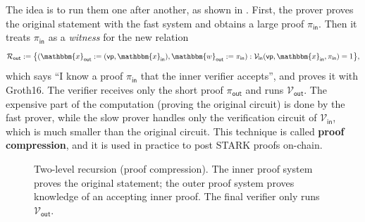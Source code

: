 \documentclass[../../book.tex]{subfiles}
\begin{document}
The idea is to run them one after another, as shown in .
First, the prover proves the original statement with the fast system and obtains a large proof $\pi_{\mathsf{in}}$.
Then it treats $\pi_{\mathsf{in}}$ as a \emph{witness} for the new relation
\begin{equation*}
    \mathcal{R}_{\mathsf{out}} := \big\{ (\mathbbm{x}_{\mathsf{out}} := (\mathsf{vp}, \mathbbm{x}_{\mathsf{in}}), \mathbbm{w}_{\mathsf{out}} := \pi_{\mathsf{in}}) : \mathcal{V}_{\mathsf{in}}(\mathsf{vp}, \mathbbm{x}_{\mathsf{in}}, \pi_{\mathsf{in}}) = 1 \big\},
\end{equation*}
which says ``I know a proof $\pi_{\mathsf{in}}$ that the inner verifier accepts'', and proves it with Groth16.
The verifier receives only the short proof $\pi_{\mathsf{out}}$ and runs $\mathcal{V}_{\mathsf{out}}$.
The expensive part of the computation (proving the original circuit) is done by the fast prover, while the slow prover handles only the verification circuit of $\mathcal{V}_{\mathsf{in}}$, which is much smaller than the original circuit.
This technique is called \textbf{proof compression}, and it is used in practice to post STARK proofs on-chain.

\begin{figure}[ht]
    \centering
    \caption{Two-level recursion (proof compression). The inner proof system proves the original statement; the outer proof system proves knowledge of an accepting inner proof. The final verifier only runs $\mathcal{V}_{\mathsf{out}}$.}
    \label{fig:two-level-recursion}
\end{figure}
\end{document}
